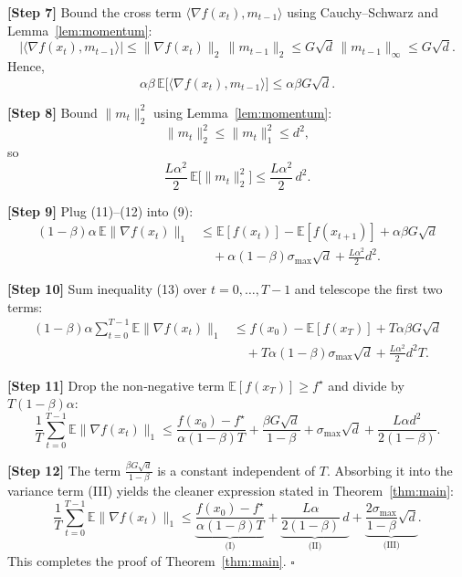 \documentclass[11pt]{article}
\begin{document}
\noindent\textbf{[Step 7]} Bound the cross term $\langle \nabla f(x_{t}), m_{t-1}\rangle$ using Cauchy–Schwarz and Lemma~\ref{lem:momentum}:
\[
    |\langle \nabla f(x_{t}), m_{t-1}\rangle|
    \le \|\nabla f(x_{t})\|_{2}\,\|m_{t-1}\|_{2}
    \le G\sqrt{d}\,\|m_{t-1}\|_{\infty}
    \le G\sqrt{d}. \tag{10}
\]
Hence,
\[
    \alpha\beta\,\mathbb{E}\!\big[\langle \nabla f(x_{t}), m_{t-1}\rangle\big] 
    \le \alpha\beta G\sqrt{d}. \tag{11}
\]

\noindent\textbf{[Step 8]} Bound $\|m_{t}\|_{2}^{2}$ using Lemma~\ref{lem:momentum}:
\[
    \|m_{t}\|_{2}^{2}\le \|m_{t}\|_{1}^{2}\le d^{2},
\]
so
\[
    \frac{L\alpha^{2}}{2}\,\mathbb{E}\!\big[\|m_{t}\|_{2}^{2}\big]\le \frac{L\alpha^{2}}{2}\,d^{2}. \tag{12}
\]

\noindent\textbf{[Step 9]} Plug (11)–(12) into (9):
\[
\begin{aligned}
    (1-\beta)\alpha\,\mathbb{E}\|\nabla f(x_{t})\|_{1}
    &\le \mathbb{E}[f(x_{t})]-\mathbb{E}[f(x_{t+1})] 
      +\alpha\beta G\sqrt{d} \\
    &\quad +\alpha(1-\beta)\sigma_{\max}\sqrt{d}
      +\frac{L\alpha^{2}}{2}d^{2}. \tag{13}
\end{aligned}
\]

\noindent\textbf{[Step 10]} Sum inequality (13) over $t=0,\dots,T-1$ and telescope the first two terms:
\[
\begin{aligned}
    (1-\beta)\alpha\sum_{t=0}^{T-1}\mathbb{E}\|\nabla f(x_{t})\|_{1}
    &\le f(x_{0})- \mathbb{E}[f(x_{T})] 
      + T\alpha\beta G\sqrt{d} \\
    &\quad + T\alpha(1-\beta)\sigma_{\max}\sqrt{d}
      + \frac{L\alpha^{2}}{2}d^{2}T. \tag{14}
\end{aligned}
\]

\noindent\textbf{[Step 11]} Drop the non‑negative term $\mathbb{E}[f(x_{T})]\ge f^{\star}$ and divide by $T(1-\beta)\alpha$:
\[
\frac{1}{T}\sum_{t=0}^{T-1}\mathbb{E}\|\nabla f(x_{t})\|_{1}
\le
\frac{f(x_{0})-f^{\star}}{\alpha(1-\beta)T}
+ \frac{\beta G\sqrt{d}}{1-\beta}
+ \sigma_{\max}\sqrt{d}
+ \frac{L\alpha d^{2}}{2(1-\beta)}. \tag{15}
\]

\noindent\textbf{[Step 12]} The term $\frac{\beta G\sqrt{d}}{1-\beta}$ is a constant independent of $T$. Absorbing it into the variance term (III) yields the cleaner expression stated in Theorem~\ref{thm:main}:
\[
\frac{1}{T}\sum_{t=0}^{T-1}\mathbb{E}\|\nabla f(x_{t})\|_{1}
\le
\underbrace{\frac{f(x_{0})-f^{\star}}{\alpha(1-\beta)T}}_{\text{(I)}}
+
\underbrace{\frac{L\alpha}{2(1-\beta)}\,d}_{\text{(II)}}
+
\underbrace{\frac{2\sigma_{\max}}{1-\beta}\sqrt{d}}_{\text{(III)}}.
\]
This completes the proof of Theorem~\ref{thm:main}. \hfill $\square$
\end{document}
